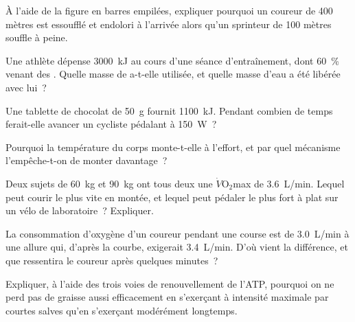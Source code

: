 \begin{exercise}[$\star\star$]\label{exo:g10:exercise-and-energy:8}
À l'aide de la figure en barres empilées, expliquer pourquoi un coureur
de 400 mètres est essoufflé et endolori à l'arrivée alors qu'un
sprinteur de 100 mètres souffle à peine.
\end{exercise}

\begin{exercise}[$\star\star$]\label{exo:g10:exercise-and-energy:9}
Une athlète dépense \qty{3000}{kJ} au cours d'une séance
d'entraînement, dont 60~\% venant des . Quelle masse de
 a-t-elle utilisée, et quelle masse d'eau a été libérée avec
lui~?
\end{exercise}

\begin{exercise}[$\star\star$]\label{exo:g10:exercise-and-energy:10}
Une tablette de chocolat de \qty{50}{g} fournit \qty{1100}{kJ}.
Pendant combien de temps ferait-elle avancer un cycliste pédalant à
\qty{150}{W}~?
\end{exercise}

\begin{exercise}[$\star\star$]\label{exo:g10:exercise-and-energy:11}
Pourquoi la température du corps monte-t-elle à l'effort, et par quel
mécanisme l'empêche-t-on de monter davantage~?
\end{exercise}

\begin{exercise}[$\star\star\star$]\label{exo:g10:exercise-and-energy:12}
Deux sujets de \qty{60}{kg} et \qty{90}{kg} ont tous deux une
$\dot V\!\mathrm{O_2}$max de \qty{3.6}{L/min}. Lequel peut courir le
plus vite en montée, et lequel peut pédaler le plus fort à plat sur un
vélo de laboratoire~? Expliquer.
\end{exercise}

\begin{exercise}[$\star\star\star$]\label{exo:g10:exercise-and-energy:13}
La consommation d'oxygène d'un coureur pendant une course est de
\qty{3.0}{L/min} à une allure qui, d'après la courbe, exigerait
\qty{3.4}{L/min}. D'où vient la différence, et que ressentira le
coureur après quelques minutes~?
\end{exercise}

\begin{exercise}[$\star\star\star$]\label{exo:g10:exercise-and-energy:14}
Expliquer, à l'aide des trois voies de renouvellement de l'ATP,
pourquoi on ne perd pas de graisse aussi efficacement en s'exerçant à
intensité maximale par courtes salves qu'en s'exerçant modérément
longtemps.
\end{exercise}

